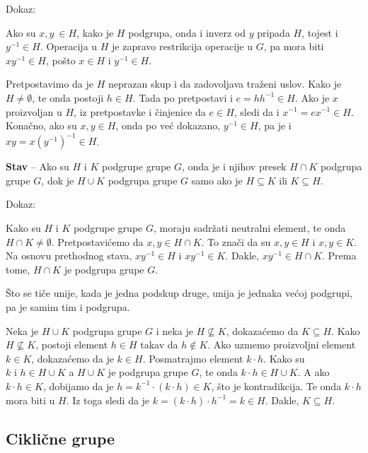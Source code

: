 \documentclass[a4paper,12pt]{article}
\newcommand{\f}[1]{\(#1\)}
\begin{document}
Dokaz:

Ako su \f{x, y\ \in H}, kako je \f{H} podgrupa, onda i inverz od \f{y} pripada \f{H}, tojest i \f{y^{-1} \in H}.
Operacija u \f{H} je zapravo restrikcija operacije u \f{G}, pa mora biti \f{xy^{-1} \in H}, pošto \f{x \in H} i 
\f{y^{-1} \in H}.

Pretpostavimo da je \f{H} neprazan skup i da zadovoljava traženi uslov. Kako je \f{H \neq \emptyset}, te onda postoji
\f{h \in H}. Tada po pretpostavi i \f{e = hh^{-1} \in H}. Ako je \f{x} proizvoljan u \f{H}, iz pretpostavke i
činjenice da \f{e \in H}, sledi da i \f{x^{-1} = ex^{-1} \in H}. Konačno, ako su \f{x, y \in H}, onda po već
dokazano, \f{y^{-1} \in H}, pa je i \f{xy = x(y^{-1})^{-1} \in H}. 


\bigskip
\textbf{Stav} -- Ako su \( H \) i \( K \) podgrupe grupe \( G \), onda je i njihov presek \( H \cap K \) podgrupa grupe \( G \),
dok je \( H \cup K \) podgrupa grupe \( G \) samo ako je \( H \subseteq K \) ili \( K \subseteq H \).

Dokaz:

Kako su $H$ i $K$ podgrupe grupe $G$, moraju sadržati neutralni element, te onda \( H \cap K \neq \emptyset \). 
Pretpostavićemo da \( x, y \in H \cap K \). To znači da su \( x, y \in H \) i \( x, y \in K \). Na osnovu
prethodnog stava, \( xy^{-1} \in H \) i \( xy^{-1} \in K \). Dakle, \( xy^{-1} \in H \cap K \).
Prema tome, \( H \cap K \) je podgrupa grupe \( G \).
\smallskip

Što se tiče unije, kada je jedna podskup druge, unija je jednaka većoj podgrupi, pa je samim tim i podgrupa.

Neka je \(H \cup K \) podgrupa grupe \( G \) i neka je \( H \not\subseteq K \), dokazaćemo da \( K \subseteq H \).
Kako \( H \not\subseteq K \), postoji element \( h \in H \) takav da \( h \notin K \). Ako uzmemo proizvoljni
element \( k \in K \), dokazaćemo da je \( k \in H \). 
Posmatrajmo element \( k \cdot h \). Kako su \( k \text{ i } h \in H \cup K \) a \( H \cup K \) je podgrupa grupe \( G \),
te onda \( k \cdot h \in H \cup K \). A ako \( k \cdot h \in K \), dobijamo da je \( h = k^{-1} \cdot (k \cdot h) \in K \), što je kontradikcija.
Te onda \( k \cdot h \) mora biti u \( H \). Iz toga sledi da je \( k = (k \cdot h) \cdot h^{-1} = k \in H \). Dakle, \( K \subseteq H \). 

\bigskip
\subsection{Ciklične grupe}
\end{document}
